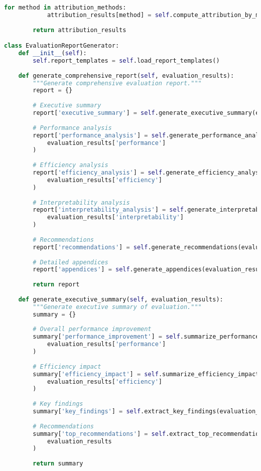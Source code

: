 \begin{lstlisting}[language=Python, caption=Comprehensive evaluation framework for custom tokens]
        for method in attribution_methods:
            attribution_results[method] = self.compute_attribution_by_method(method)
        
        return attribution_results

class EvaluationReportGenerator:
    def __init__(self):
        self.report_templates = self.load_report_templates()
    
    def generate_comprehensive_report(self, evaluation_results):
        """Generate comprehensive evaluation report."""
        report = {}
        
        # Executive summary
        report['executive_summary'] = self.generate_executive_summary(evaluation_results)
        
        # Performance analysis
        report['performance_analysis'] = self.generate_performance_analysis(
            evaluation_results['performance']
        )
        
        # Efficiency analysis
        report['efficiency_analysis'] = self.generate_efficiency_analysis(
            evaluation_results['efficiency']
        )
        
        # Interpretability analysis
        report['interpretability_analysis'] = self.generate_interpretability_analysis(
            evaluation_results['interpretability']
        )
        
        # Recommendations
        report['recommendations'] = self.generate_recommendations(evaluation_results)
        
        # Detailed appendices
        report['appendices'] = self.generate_appendices(evaluation_results)
        
        return report
    
    def generate_executive_summary(self, evaluation_results):
        """Generate executive summary of evaluation."""
        summary = {}
        
        # Overall performance improvement
        summary['performance_improvement'] = self.summarize_performance_improvements(
            evaluation_results['performance']
        )
        
        # Efficiency impact
        summary['efficiency_impact'] = self.summarize_efficiency_impact(
            evaluation_results['efficiency']
        )
        
        # Key findings
        summary['key_findings'] = self.extract_key_findings(evaluation_results)
        
        # Recommendations
        summary['top_recommendations'] = self.extract_top_recommendations(
            evaluation_results
        )
        
        return summary
\end{lstlisting}